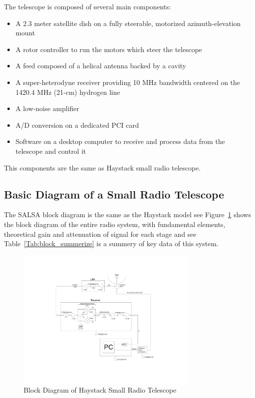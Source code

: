 \documentclass[conference]{IEEEtran}
\begin{document}
The telescope is composed of several main components:
\begin{itemize}
\item A 2.3 meter satellite dish on a fully steerable, motorized azimuth-elevation mount
\item A rotor controller to run the motors which steer the telescope
\item A feed composed of a helical antenna backed by a cavity
\item A super-heterodyne receiver providing 10 MHz bandwidth centered on the 1420.4 MHz (21-cm) hydrogen line
\item A low-noise amplifier
\item A/D conversion on a dedicated PCI card
\item Software on a desktop computer to receive and process data from the telescope and control it
\end{itemize}

This components are the same as Haystack small radio telescope\cite{DustinJohnson2012}.

\subsection{Basic Diagram of a Small Radio Telescope}

The SALSA block diagram is the same as the Haystack model see Figure~\ref{fig:block_figure} shows the block diagram of the entire radio system, with fundamental elements, theoretical gain and attenuation of signal for each stage and see Table~\ref{Tab:block_summerize} is a summery of key data of this system\cite{DustinJohnson2012}.

\begin{figure}[htbp]
\centerline{\includegraphics[width=3.5in]{block.pdf}}
\caption{Block Diagram of Haystack Small Radio Telescope}
\label{fig:block_figure}
\end{figure}
\end{document}
